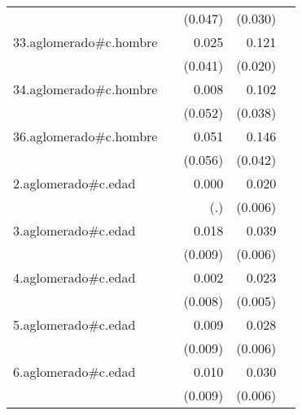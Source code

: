 {\begin{longtable}{l*{4}{D{.}{.}{-1}}}
            &                     &     (0.047)         &     (0.030)         &                     \\
\addlinespace
33.aglomerado#c.hombre&                     &       0.025         &       0.121\sym{***}&                     \\
            &                     &     (0.041)         &     (0.020)         &                     \\
\addlinespace
34.aglomerado#c.hombre&                     &       0.008         &       0.102\sym{**} &                     \\
            &                     &     (0.052)         &     (0.038)         &                     \\
\addlinespace
36.aglomerado#c.hombre&                     &       0.051         &       0.146\sym{***}&                     \\
            &                     &     (0.056)         &     (0.042)         &                     \\
\addlinespace
2.aglomerado#c.edad&                     &       0.000         &       0.020\sym{***}&                     \\
            &                     &         (.)         &     (0.006)         &                     \\
\addlinespace
3.aglomerado#c.edad&                     &       0.018\sym{*}  &       0.039\sym{***}&                     \\
            &                     &     (0.009)         &     (0.006)         &                     \\
\addlinespace
4.aglomerado#c.edad&                     &       0.002         &       0.023\sym{***}&                     \\
            &                     &     (0.008)         &     (0.005)         &                     \\
\addlinespace
5.aglomerado#c.edad&                     &       0.009         &       0.028\sym{***}&                     \\
            &                     &     (0.009)         &     (0.006)         &                     \\
\addlinespace
6.aglomerado#c.edad&                     &       0.010         &       0.030\sym{***}&                     \\
            &                     &     (0.009)         &     (0.006)         &                     \\

\end{longtable}}

